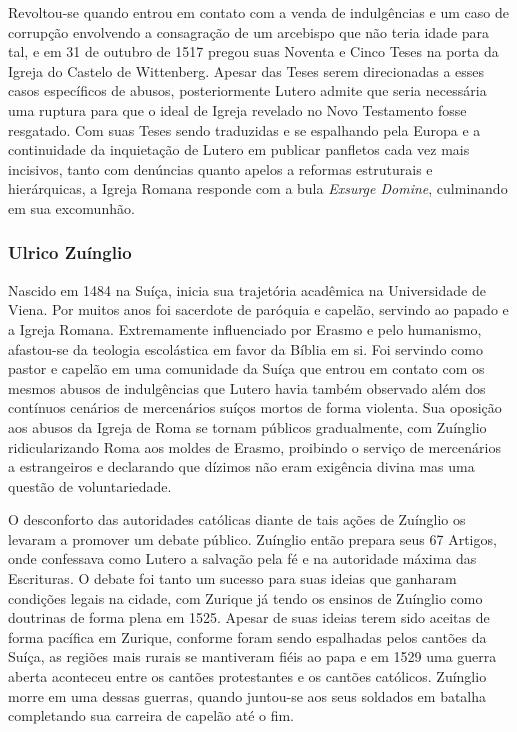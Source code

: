 \documentclass[
    article,            %
	12pt,				%
	oneside,			%
	a4paper,			%
	chapter=TITLE,		%
	section=TITLE,		%
	english,			%
	french,				%
	spanish,			%
	brazil				%
	]{abntex2}
\begin{document}
Revoltou-se quando entrou em contato com a venda de indulgências e um caso de corrupção envolvendo a consagração de um arcebispo que não teria idade para tal, e em 31 de outubro de 1517 pregou suas Noventa e Cinco Teses na porta da Igreja do Castelo de Wittenberg. Apesar das Teses serem direcionadas a esses casos específicos de abusos, posteriormente Lutero admite que seria necessária uma ruptura para que o ideal de Igreja revelado no Novo Testamento fosse resgatado. Com suas Teses sendo traduzidas e se espalhando pela Europa e a continuidade da inquietação de Lutero em publicar panfletos cada vez mais incisivos, tanto com denúncias quanto apelos a reformas estruturais e hierárquicas, a Igreja Romana responde com a bula \emph{Exsurge Domine}, culminando em sua excomunhão.

\subsubsection{Ulrico Zuínglio}
Nascido em 1484 na Suíça, inicia sua trajetória acadêmica na Universidade de Viena. Por muitos anos foi sacerdote de paróquia e capelão, servindo ao papado e a Igreja Romana. Extremamente influenciado por Erasmo e pelo humanismo, afastou-se da teologia escolástica em favor da Bíblia em si. Foi servindo como pastor e capelão em uma comunidade da Suíça que entrou em contato com os mesmos abusos de indulgências que Lutero havia também observado além dos contínuos cenários de mercenários suíços mortos de forma violenta. Sua oposição aos abusos da Igreja de Roma se tornam públicos gradualmente, com Zuínglio ridicularizando Roma aos moldes de Erasmo, proibindo o serviço de mercenários a estrangeiros e declarando que dízimos não eram exigência divina mas uma questão de voluntariedade.

O desconforto das autoridades católicas diante de tais ações de Zuínglio os levaram a promover um debate público. Zuínglio então prepara seus 67 Artigos, onde confessava como Lutero a salvação pela fé e na autoridade máxima das Escrituras. O debate foi tanto um sucesso para suas ideias que ganharam condições legais na cidade, com Zurique já tendo os ensinos de Zuínglio como doutrinas de forma plena em 1525. Apesar de suas ideias terem sido aceitas de forma pacífica em Zurique, conforme foram sendo espalhadas pelos cantões da Suíça, as regiões mais rurais se mantiveram fiéis ao papa e em 1529 uma guerra aberta aconteceu entre os cantões protestantes e os cantões católicos. Zuínglio morre em uma dessas guerras, quando juntou-se aos seus soldados em batalha completando sua carreira de capelão até o fim.
\end{document}
